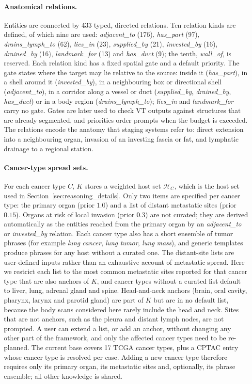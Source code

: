 \documentclass[fleqn,10pt]{olplainarticle}
\begin{document}
\paragraph{Anatomical relations.}
Entities are connected by 433 typed, directed relations. Ten relation kinds are defined, of which nine are used:
\emph{adjacent\_to} (176), \emph{has\_part} (97), \emph{drains\_lymph\_to} (62), \emph{lies\_in} (23),
\emph{supplied\_by} (21), \emph{invested\_by} (16), \emph{drained\_by} (16), \emph{landmark\_for} (13) and
\emph{has\_duct} (9); the tenth, \emph{wall\_of}, is reserved. Each relation kind has a fixed spatial gate and a default
priority. The gate states where the target may lie relative to the source: inside it (\emph{has\_part}), in a shell
around it (\emph{invested\_by}), in a neighbouring box or directional shell (\emph{adjacent\_to}), in a corridor along
a vessel or duct (\emph{supplied\_by}, \emph{drained\_by}, \emph{has\_duct}) or in a body region
(\emph{drains\_lymph\_to}); \emph{lies\_in} and \emph{landmark\_for} carry no gate. Gates are later used to check VT
outputs against structures that are already segmented, and priorities order prompts when the budget is exceeded. The relations encode the anatomy that staging systems refer to: direct extension
into a neighbouring organ, invasion of an investing fascia or fat, and lymphatic drainage to a regional station.

\paragraph{Cancer-type spread sets.}
For each cancer type $C$, $K$ stores a weighted host set $\mathcal{H}_C$, which is the host set used in
Section~\ref{sec:reasoning_details}. Only two items are specified per cancer type: the primary organ (prior $1.0$) and a list of
distant metastatic sites (prior $0.15$). Organs at risk of local invasion (prior $0.3$) are not curated; they are
derived automatically as the entities reached from the primary organ by an \emph{adjacent\_to} or \emph{invested\_by}
relation. Each cancer type also has a short ensemble of tumor phrases (for example \emph{lung cancer}, \emph{lung
tumor}, \emph{lung mass}), and generic templates produce phrases for any host without a curated one. The distant-site lists are user-defined inputs rather than an exhaustive account of metastatic spread. Here we
restrict each list to the most common metastatic sites reported for that cancer type that are also anchors of $K$, and
cancer types without a curated list default to liver, lung, adrenal gland and spine. Head-and-neck anchors (brain, oral cavity,
pharynx, larynx and parotid gland) are part of $K$ but are in no default list, because the body scans considered here
rarely include the head and neck. Sites that are not anchors, such
as the pleura and distant lymph nodes, are not prompted. A user can extend a list, or add an anchor, without changing any other part of the framework, and only the affected cancer types need to be re-planned. The current
base covers 17 TCGA cancer types, plus a CPTAC entry whose cancer type is resolved per case. Adding a new cancer type
therefore requires only its primary organ, its metastatic sites and, optionally, its phrase ensemble; all other
knowledge is shared.
\end{document}
